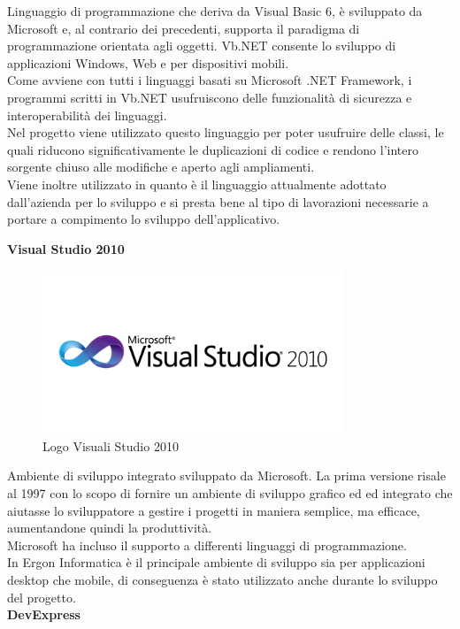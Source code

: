 Linguaggio di programmazione che deriva da Visual Basic 6, è sviluppato da Microsoft e, al contrario dei precedenti, supporta il paradigma di programmazione orientata agli oggetti.
Vb.NET consente lo sviluppo di applicazioni Windows, Web e per dispositivi mobili. \\
Come avviene con tutti i linguaggi basati su Microsoft .NET Framework,
i programmi scritti in Vb.NET usufruiscono delle funzionalità di sicurezza e interoperabilità dei linguaggi.\\
Nel progetto viene utilizzato questo linguaggio per poter usufruire delle classi, le quali riducono significativamente le duplicazioni di codice e rendono l'intero sorgente 
chiuso alle modifiche e aperto agli ampliamenti. \\Viene inoltre utilizzato in quanto è il linguaggio attualmente adottato dall'azienda per lo sviluppo e si presta bene
al tipo di lavorazioni necessarie a portare a compimento lo sviluppo dell'applicativo.

\newpage
\textbf{Visual Studio 2010}

\begin{figure}[H]
	\includegraphics[width=9cm]{immagini/microsoft-visual-studio-2010-logo.png}
	\centering
	\caption{Logo Visuali Studio 2010}
\end{figure}

Ambiente di sviluppo integrato sviluppato da Microsoft. 
La prima versione risale al 1997 con lo scopo di fornire
un ambiente di sviluppo grafico ed  ed integrato che aiutasse lo sviluppatore a gestire i progetti in maniera semplice, ma efficace, aumentandone quindi la produttività.\\
Microsoft ha incluso il supporto a differenti linguaggi di programmazione.\\
In Ergon Informatica è il principale ambiente di sviluppo sia per applicazioni desktop che mobile, di conseguenza è stato utilizzato anche durante lo sviluppo del progetto.\\

\textbf{DevExpress}

